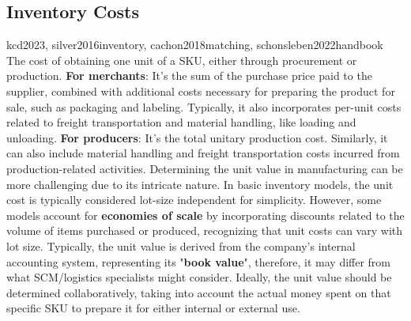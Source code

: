 \documentclass{jorbnc_cheatsheet}
\begin{document}
\begin{multicols*}{4}
\subsection{Inventory Costs}

{kcd2023, silver2016inventory, cachon2018matching, schonsleben2022handbook}{
The cost of obtaining one unit of a SKU, either through procurement or production.
\breakspace
\textbf{For merchants}:
It's the sum of the purchase price paid to the supplier, combined with additional costs necessary 
for preparing the product for sale, such as packaging and labeling. Typically, it also incorporates 
per-unit costs related to freight transportation and material handling, like loading and unloading.
\breakspace
\textbf{For producers}:
It's the total unitary production cost. Similarly, it can also include material handling and freight
transportation costs incurred from production-related activities.
Determining the unit value in manufacturing can be more challenging  due to its intricate nature.
\breakspace
In basic inventory models, the unit cost is typically considered lot-size independent for simplicity.
However, some models account for \textbf{economies of scale} by incorporating discounts related to the volume of 
items purchased or produced, recognizing that unit costs can vary with lot size.
\breakspace
Typically, the unit value is derived from the company's internal accounting system, representing its
"\textbf{book value}", therefore, it may differ from what SCM/logistics specialists might consider. 
Ideally, the unit value should be determined collaboratively, taking into account the actual money 
spent on that specific SKU to prepare it for either internal or external use.
}




\end{multicols*}
\end{document}

